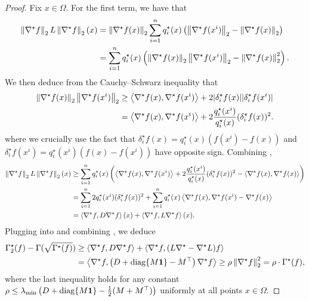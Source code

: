 \begin{proof}
    
    Fix $x\in \Omega$. For the first term, we have that
    \begin{align}
        \left\lVert \nabla^\star f \right\rVert_2 L \left\lVert \nabla^\star f \right\rVert_2 (x)
        &= \left\lVert \nabla^\star f(x) \right\rVert_2 \sum_{i=1}^n q^\star_i(x) \left(\left\lVert \nabla^\star f(x^i) \right\rVert_2 - \left\lVert \nabla^\star f(x) \right\rVert_2\right) \nonumber \\
        &= \sum_{i=1}^n q^\star_i(x) \left(\left\lVert \nabla^\star f(x) \right\rVert_2 \left\lVert \nabla^\star f(x^i) \right\rVert_2 - \left\lVert \nabla^\star f(x) \right\rVert_2^2\right). \label{eq:norm-L-norm}
    \end{align}
    We then deduce from the Cauchy--Schwarz inequality that
    \begin{align}
        \left\lVert \nabla^\star f(x) \right\rVert_2 \left\lVert \nabla^\star f(x^i) \right\rVert_2
        &\ge \left\langle \nabla^\star f(x),\nabla^\star f(x^i)\right\rangle + 2|\delta^\star_i f(x)| |\delta^\star_i f(x^i)| \nonumber\\
        &= \left\langle \nabla^\star f(x),\nabla^\star f(x^i)\right\rangle + 2 \frac{q^\star_i(x^i)}{q^\star_i(x)} (\delta^\star_i f(x))^2. \label{eq:cauchy-schwarz}
    \end{align}
    where we crucially use the fact that $\delta^\star_i f(x) = q^\star_i(x) (f(x^i)-f(x))$ and $\delta^\star_i f(x^i) = q^\star_i(x^i) (f(x)-f(x^i))$ have opposite sign.
    Combining ,
    \begin{align*}
        \left\lVert \nabla^\star f \right\rVert_2 L \left\lVert \nabla^\star f \right\rVert_2 (x)
        &\ge \sum_{i=1}^n q^\star_i(x) \left( \left\langle \nabla^\star f(x),\nabla^\star f(x^i)\right\rangle + 2 \frac{q^\star_i(x^i)}{q^\star_i(x)} (\delta^\star_i f(x))^2 - \left\langle \nabla^\star f(x),\nabla^\star f(x)\right\rangle \right) \\
        &= \sum_{i=1}^n 2 q^\star_i(x^i) (\delta^\star_i f(x))^2 + \sum_{i=1}^n q^\star_i(x) \left\langle \nabla^\star f(x),\nabla^\star f(x^i) - \nabla^\star f(x)\right\rangle \\
        &= \left\langle \nabla^\star f,D \nabla^\star f\right\rangle (x) + \left\langle \nabla^\star f,L \nabla^\star f\right\rangle (x).
    \end{align*}
    Plugging into  and combining , we deduce
    \begin{align*}
        \Gamma^\star_2(f) - \Gamma(\sqrt{\Gamma^\star(f)}) 
        &\ge \left\langle \nabla^\star f,D \nabla^\star f\right\rangle + \left\langle \nabla^\star f,(L \nabla^\star - \nabla^\star L) f\right\rangle \\
        &= \left\langle \nabla^\star f,\left( D + \mathrm{diag}\{M\boldsymbol{1}\} - M^\top \right) \nabla^\star f\right\rangle
        \ge \rho \left\lVert \nabla^\star f \right\rVert_2^2 = \rho \cdot \Gamma^\star(f),
    \end{align*}
    where the last inequality holds for any constant $\rho \le \lambda_{\min} \left( D + \mathrm{diag}\{M\boldsymbol{1}\} - \frac{1}{2}(M+M^\top) \right)$ uniformly at all points $x \in \Omega$.
\end{proof}

